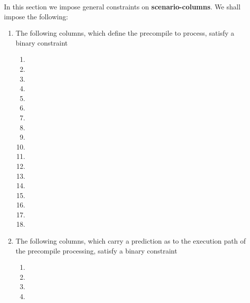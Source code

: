\begin{center}
\end{center}
In this section we impose general constraints on \textbf{scenario-columns}. We shall impose the following:
\begin{enumerate}
	\item The following columns, which define the precompile to process, satisfy a binary constraint \lispDone{}
		\begin{multicols}{2}
			\begin{enumerate}
				\item \scenEcrecover{}
				\item \scenShaTwo{}
				\item \scenRipemd{}
				\item \scenIdentity{}
				\item \scenModexp{}
				\item \scenEcadd{}
				\item \scenEcmul{}
				\item \scenEcpairing{}
				\item \scenBlake{}
				\item \scenPointEvaluation{}
				\item \scenBlsGoneAdd{}
				\item \scenBlsGoneMsm{}
				\item \scenBlsGtwoAdd{}
				\item \scenBlsGtwoMsm{}
				\item \scenBlsPairingCheck{}
				\item \scenBlsMapFpToGone{}
				\item \scenBlsMapFpTwoToGtwo{}
				\item[\vspace{\fill}]
			\end{enumerate}
		\end{multicols}
	\item The following columns, which carry a prediction as to the execution path of the precompile processing, satisfy a binary constraint \lispDone{}
		\begin{enumerate}[resume]
			\item \scenPrcFailureKnownToHub{}
			\item \scenPrcFailureKnownToRam{}
			\item \scenPrcSuccessWillRevert{}
			\item \scenPrcSuccessWontRevert{}
		\end{enumerate}
\end{enumerate}
